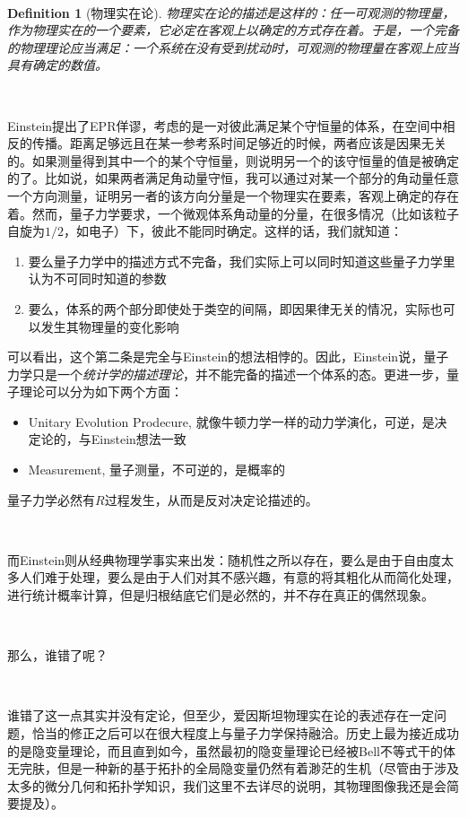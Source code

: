 \documentclass[aps,showpacs,twocolumn]{revtex4}%
\newtheorem{defi}{Definition}
\begin{document}
\ 

\begin{defi}[物理实在论]
物理实在论的描述是这样的：任一可观测的物理量，作为物理实在的一个要素，它必定在客观上以确定的方式存在着。于是，一个完备的物理理论应当满足：一个系统在没有受到扰动时，可观测的物理量在客观上应当具有确定的数值。
\end{defi}

\ 

Einstein提出了EPR佯谬，考虑的是一对彼此满足某个守恒量的体系，在空间中相反的传播。距离足够远且在某一参考系时间足够近的时候，两者应该是因果无关的。如果测量得到其中一个的某个守恒量，则说明另一个的该守恒量的值是被确定的了。比如说，如果两者满足角动量守恒，我可以通过对某一个部分的角动量任意一个方向测量，证明另一者的该方向分量是一个物理实在要素，客观上确定的存在着。然而，量子力学要求，一个微观体系角动量的分量，在很多情况（比如该粒子自旋为$1/2$，如电子）下，彼此不能同时确定。这样的话，我们就知道：

\begin{enumerate}
\item 要么量子力学中的描述方式不完备，我们实际上可以同时知道这些量子力学里认为不可同时知道的参数
\item 要么，体系的两个部分即使处于类空的间隔，即因果律无关的情况，实际也可以发生其物理量的变化影响
\end{enumerate}

可以看出，这个第二条是完全与Einstein的想法相悖的。因此，Einstein说，量子力学只是一个\emph{统计学的描述理论}，并不能完备的描述一个体系的态。更进一步，量子理论可以分为如下两个方面：

\begin{itemize}
\item Unitary Evolution Prodecure, 就像牛顿力学一样的动力学演化，可逆，是决定论的，与Einstein想法一致
\item Measurement, 量子测量，不可逆的，是概率的
\end{itemize}

量子力学必然有$R$过程发生，从而是反对决定论描述的。

\ 

而Einstein则从经典物理学事实来出发：随机性之所以存在，要么是由于自由度太多人们难于处理，要么是由于人们对其不感兴趣，有意的将其粗化从而简化处理，进行统计概率计算，但是归根结底它们是必然的，并不存在真正的偶然现象。

\ 

那么，谁错了呢？

\ 

谁错了这一点其实并没有定论，但至少，爱因斯坦物理实在论的表述存在一定问题，恰当的修正之后可以在很大程度上与量子力学保持融洽。历史上最为接近成功的是隐变量理论，而且直到如今，虽然最初的隐变量理论已经被Bell不等式干的体无完肤，但是一种新的基于拓扑的全局隐变量仍然有着渺茫的生机（尽管由于涉及太多的微分几何和拓扑学知识，我们这里不去详尽的说明，其物理图像我还是会简要提及）。
\end{document}
